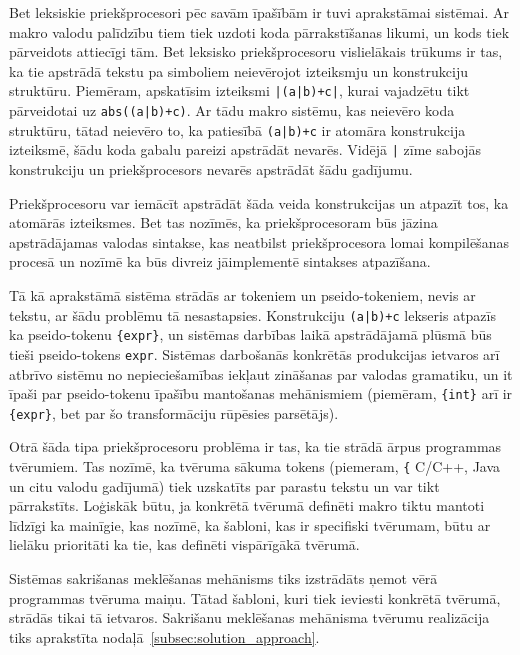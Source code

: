 Bet leksiskie priekšprocesori pēc savām īpašībām ir tuvi aprakstāmai sistēmai. Ar makro valodu palīdzību tiem tiek uzdoti koda pārrakstīšanas likumi, un kods tiek pārveidots attiecīgi tām. Bet leksisko priekšprocesoru vislielākais trūkums ir tas, ka tie apstrādā tekstu pa simboliem neievērojot izteiksmju un konstrukciju struktūru. Piemēram, apskatīsim izteiksmi \verb/|(a|b)+c|/, kurai vajadzētu tikt pārveidotai uz \verb/abs((a|b)+c)/. Ar tādu makro sistēmu, kas neievēro koda struktūru, tātad neievēro to, ka patiesībā \verb/(a|b)+c/ ir atomāra konstrukcija izteiksmē, šādu koda gabalu pareizi apstrādāt nevarēs. Vidējā \verb/|/ zīme sabojās konstrukciju un priekšprocesors nevarēs apstrādāt šādu gadījumu.

Priekšprocesoru var iemācīt apstrādāt šāda veida konstrukcijas un atpazīt tos, ka atomārās izteiksmes. Bet tas nozīmēs, ka priekšprocesoram būs jāzina apstrādājamas valodas sintakse, kas neatbilst priekšprocesora lomai kompilēšanas procesā un nozīmē ka būs divreiz jāimplementē sintakses atpazīšana.

Tā kā aprakstāmā sistēma strādās ar tokeniem un pseido-tokeniem, nevis ar tekstu, ar šādu problēmu tā nesastapsies. Konstrukciju \verb/(a|b)+c/ lekseris atpazīs ka pseido-tokenu \verb|{expr}|, un sistēmas darbības laikā apstrādājamā plūsmā būs tieši pseido-tokens \verb|expr|. Sistēmas darbošanās konkrētās produkcijas ietvaros arī atbrīvo sistēmu no nepieciešamības iekļaut zināšanas par valodas gramatiku, un it īpaši par pseido-tokenu īpašību mantošanas mehānismiem (piemēram, \verb|{int}| arī ir \verb|{expr}|, bet par šo transformāciju rūpēsies parsētājs).

Otrā šāda tipa priekšprocesoru problēma ir tas, ka tie strādā ārpus programmas tvērumiem. Tas nozīmē, ka tvēruma sākuma tokens (piemeram, \verb|{| C/C++, Java un citu valodu gadījumā) tiek uzskatīts par parastu tekstu un var tikt pārrakstīts. Loģiskāk būtu, ja konkrētā tvērumā definēti makro tiktu mantoti līdzīgi ka mainīgie, kas nozīmē, ka šabloni, kas ir specifiski tvērumam, būtu ar lielāku prioritāti ka tie, kas definēti vispārīgākā tvērumā. 

Sistēmas sakrišanas meklēšanas mehānisms tiks izstrādāts ņemot vērā programmas tvēruma maiņu. Tātad šabloni, kuri tiek ieviesti konkrētā tvērumā, strādās tikai tā ietvaros. Sakrišanu meklēšanas mehānisma tvērumu realizācija tiks aprakstīta nodaļā~\ref{subsec:solution_approach}.

